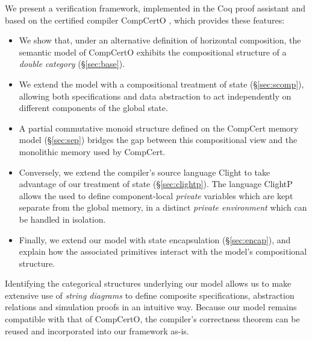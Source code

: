 \documentclass[acmsmall,screen,review,anonymous]{acmart}
\begin{document}
We present a verification framework,
implemented in the Coq proof assistant
and based on the certified compiler CompCertO \cite{compcerto},
which provides these features:
\begin{itemize}
  \item We show that,
    under an alternative definition of horizontal composition,
    the semantic model of CompCertO
    exhibits the compositional structure of a \emph{double category}
    (\S\ref{sec:base}).
  \item We extend the model
    with a compositional treatment of state (\S\ref{sec:scomp}),
    allowing both specifications and data abstraction
    to act independently on different components of the global state.
  \item 
    A partial commutative monoid structure
    defined on the CompCert memory model (\S\ref{sec:sep})
    bridges the gap between this compositional view
    and the monolithic memory used by CompCert.
  \item
    Conversely,
    we extend the compiler's source language Clight
    to take advantage of our treatment of state (\S\ref{sec:clightp}).
    The language ClightP allows the used to define
    component-local \emph{private} variables
    which are kept separate from the global memory,
    in a distinct \emph{private environment}
    which can be handled in isolation.
  \item
    Finally,
    we extend our model with state encapsulation (\S\ref{sec:encap}),
    and explain how the associated primitives
    interact with the model's compositional structure.
\end{itemize}
Identifying the categorical structures underlying our model
allows us to make extensive use of \emph{string diagrams} \cite{dcsd}
to define composite specifications, abstraction relations and simulation proofs
in an intuitive way.
Because our model remains compatible with that of CompCertO,
the compiler's correctness theorem
can be reused and incorporated into our framework as-is.

\end{document}

